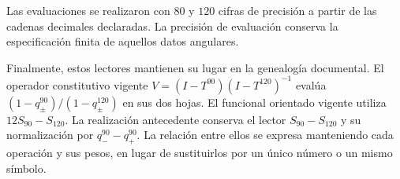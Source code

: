Las evaluaciones se realizaron con $80$ y $120$ cifras de precisión a partir
de las cadenas decimales declaradas. La precisión de evaluación conserva
la especificación finita de aquellos datos angulares.

Finalmente, estos lectores mantienen su lugar en la genealogía documental.
El operador constitutivo vigente
$V=(I-T^{90})(I-T^{120})^{-1}$ evalúa
$(1-q_\pm^{90})/(1-q_\pm^{120})$ en sus dos hojas. El funcional orientado
vigente utiliza $12S_{90}-S_{120}$. La realización antecedente conserva el lector
$S_{90}-S_{120}$ y su normalización por $q_-^{90}-q_+^{90}$.
La relación entre ellos se expresa manteniendo cada operación y sus pesos,
en lugar de sustituirlos por un único número o un mismo símbolo.
